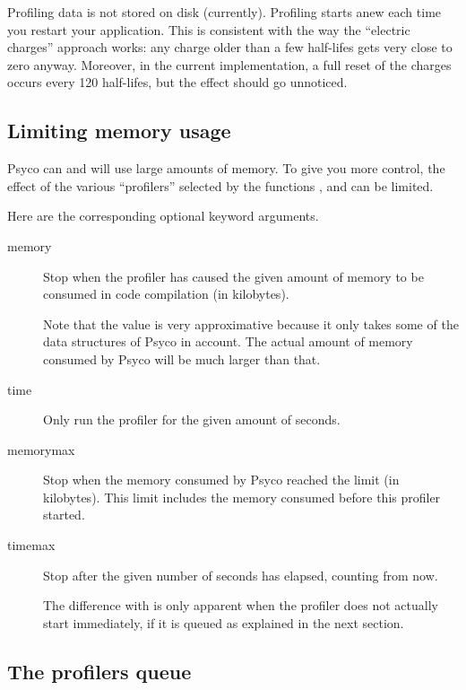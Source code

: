 \documentclass{manual}
\begin{document}
Profiling data is not stored on disk (currently).  Profiling starts anew each time you restart your application.  This is consistent with the way the ``electric charges'' approach works: any charge older than a few half-lifes gets very close to zero anyway.  Moreover, in the current implementation, a full reset of the charges occurs every 120 half-lifes, but the effect should go unnoticed.


\subsection{Limiting memory usage}\label{memlimits}

Psyco can and will use large amounts of memory.  To give you more control, the effect of the various ``profilers'' selected by the functions ,  and  can be limited.

Here are the corresponding optional keyword arguments.
%
%
\begin{description}

\item[memory]
  Stop when the profiler has caused the given amount of memory to be consumed in code compilation (in kilobytes).

  Note that the value is very approximative because it only takes some of the data structures of Psyco in account.  The actual amount of memory consumed by Psyco will be much larger than that.

\item[time]
  Only run the profiler for the given amount of seconds.

\item[memorymax]
  Stop when the memory consumed by Psyco reached the limit (in kilobytes).  This limit includes the memory consumed before this profiler started.

\item[timemax]
  Stop after the given number of seconds has elapsed, counting from now.

  The difference with  is only apparent when the profiler does not actually start immediately, if it is queued as explained in the next section.
  
\end{description}


\subsection{The profilers queue}
\end{document}

